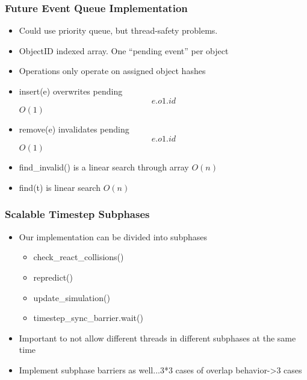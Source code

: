 \documentclass{beamer}
\begin{document}
\begin{frame}
      \frametitle{Future Event Queue Implementation}
      \begin{itemize}
      \item Could use priority queue, but thread-safety problems.
       \item ObjectID indexed array.  One ``pending event'' per object
        \item Operations only operate on assigned object hashes
	\item insert(e) overwrites pending\[e.o1.id\] $O(1)$
	\item remove(e) invalidates pending\[e.o1.id\] $O(1)$
	\item find\_invalid() is a linear search through array $O(n)$
	\item find(t) is linear search $O(n)$
      \end{itemize}
\end{frame}


\begin{frame}
	\frametitle{Scalable Timestep Subphases}
	\begin{itemize}
		\item Our implementation can be divided into subphases
		\begin{itemize}
			\item check\_react\_collisions()
			\item repredict()
			\item update\_simulation()
			\item timestep\_sync\_barrier.wait()
		\end{itemize}
		\item Important to not allow different threads in different subphases at the same time
		\item Implement subphase barriers as well...3*3 cases of overlap behavior->3 cases
	\end{itemize}
\end{frame}
\end{document}
